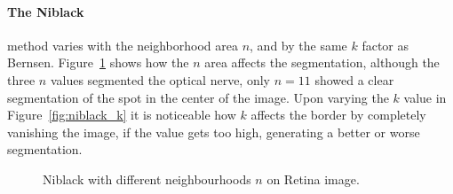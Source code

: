 \documentclass[conference]{IEEEtran}
\begin{document}
\paragraph*{The Niblack} method varies with the neighborhood area $n$, and by the same $k$ factor as Bernsen. Figure~\ref{fig:niblack_n} shows how the $n$ area affects the segmentation, although the three $n$ values segmented the optical nerve, only $n = 11$ showed a clear segmentation of the spot in the center of the image. Upon varying the $k$ value in Figure~\ref{fig:niblack_k} it is noticeable how $k$ affects the border by completely vanishing the image, if the value gets too high, generating a better or worse segmentation.
\begin{figure}[htbp]
	\centering
	\quad
	\caption{Niblack with different neighbourhoods $n$ on Retina image.}
	\label{fig:niblack_n}
\end{figure}
\end{document}
